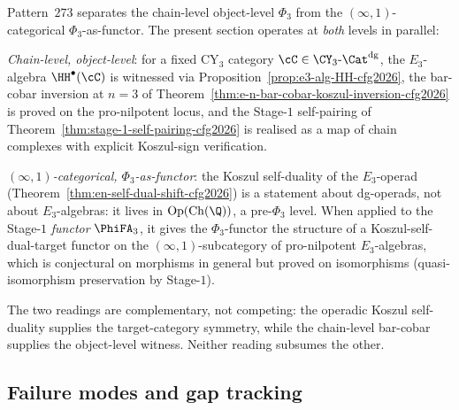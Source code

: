 \begin{remark}
\label{rem:agent-11-pattern-273-e3-koszul-cfg2026}
Pattern~$273$ separates the chain-level object-level $\Phi_3$ from the
$(\infty,1)$-categorical $\Phi_3$-as-functor. The present section
operates at \emph{both} levels in parallel:

\emph{Chain-level, object-level}: for a fixed CY$_3$ category
$\cC \in \CY_3\text{-}\Cat^{\mathrm{dg}}$, the $E_3$-algebra
$\HH^\bullet(\cC)$ is witnessed via
Proposition~\textup{\ref{prop:e3-alg-HH-cfg2026}}, the bar-cobar
inversion at $n = 3$ of
Theorem~\textup{\ref{thm:e-n-bar-cobar-koszul-inversion-cfg2026}} is
proved on the pro-nilpotent locus, and the Stage-$1$ self-pairing of
Theorem~\textup{\ref{thm:stage-1-self-pairing-cfg2026}} is realised as a
map of chain complexes with explicit Koszul-sign verification.

\emph{$(\infty,1)$-categorical, $\Phi_3$-as-functor}: the Koszul
self-duality of the $E_3$-operad
(Theorem~\textup{\ref{thm:en-self-dual-shift-cfg2026}}) is a statement
about dg-operads, not about $E_3$-algebras: it lives in
$\mathrm{Op}(\mathrm{Ch}(\Q))$, a pre-$\Phi_3$ level. When applied to
the Stage-$1$ \emph{functor} $\PhiFA_3$, it gives the $\Phi_3$-functor
the structure of a Koszul-self-dual-target functor on the
$(\infty,1)$-subcategory of pro-nilpotent $E_3$-algebras, which is
conjectural on morphisms in general but proved on isomorphisms
(quasi-isomorphism preservation by Stage-$1$).

The two readings are complementary, not competing: the operadic
Koszul self-duality supplies the target-category symmetry, while the
chain-level bar-cobar supplies the object-level witness. Neither
reading subsumes the other.
\end{remark}

\subsection*{Failure modes and gap tracking}


